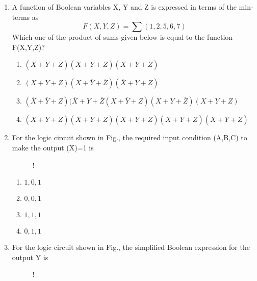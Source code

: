 \documentclass[journal,12pt,twocolumn]{IEEEtran}
\begin{document}
\begin{enumerate}
\begin{enumerate}
    \end{enumerate}
\item A function of Boolean variables X, Y and Z is expressed in terms of the min-terms as $$F(X,Y,Z)=\sum(1,2,5,6,7)$$ Which one of the product of sums given below is equal to the function F(X,Y,Z)?
    \begin{enumerate}
      \item $(\overline{X}+\overline{Y}+\overline{Z})(\overline{X}+Y+Z)(X+\overline{Y}+\overline{Z})$
      \item $(X+Y+Z)(X+\overline{Y}+\overline{Z})(\overline{X}+Y+Z)$
      \item $(\overline{X}+\overline{Y}+Z)(\overline{X}+Y+\overline{Z}(X+\overline{Y}+Z)(X+Y+\overline{Z})(X+Y+Z)$
      \item $(X+Y+\overline{Z})(\overline{X}+Y+Z)(\overline{X}+Y+\overline{Z})(\overline{X}+\overline{Y}+Z)(\overline{X}+\overline{Y}+\overline{Z})$
    \end{enumerate}

\item For the logic circuit shown in Fig., the required input condition (A,B,C) to
make the output (X)=1 is
%
\begin{figure}[!h]
\centering
\resizebox {\columnwidth} {!} {

}
\caption{}
\end{figure}
%
    
     \begin{enumerate}
      \item $ 1,0,1$
      \item $0,0,1$
      \item $1,1,1$
      \item $0,1,1$
    \end{enumerate}
   
    
    \item For the logic circuit shown in Fig., the simplified Boolean expression for the
output Y is
\begin{figure}[!h]
\centering
\resizebox {\columnwidth} {!} {

}
\caption{}
\end{figure}


\end{enumerate}
\end{document}
